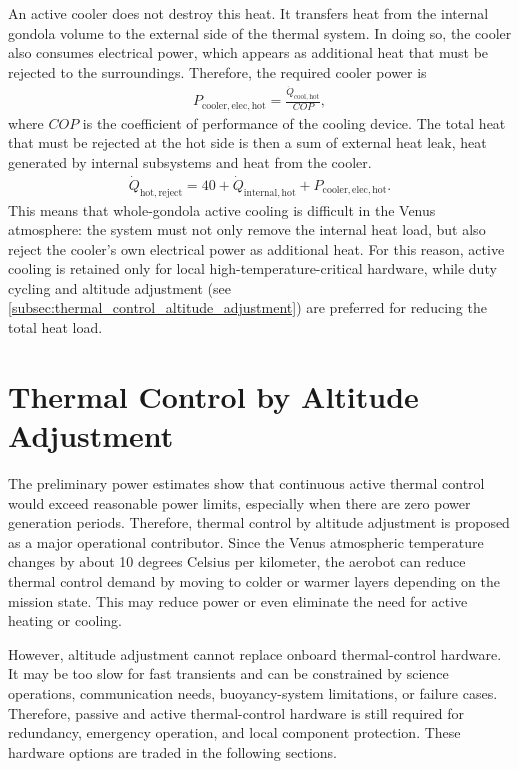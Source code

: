 An active cooler does not destroy this heat. It transfers heat from the internal gondola volume to the external side of the thermal system. In doing so, the cooler also consumes electrical power, which appears as additional heat that must be rejected to the surroundings. Therefore, the required cooler power is
\begin{align}
    P_{\mathrm{cooler,elec,hot}}
    =
    \frac{\dot{Q}_{\mathrm{cool,hot}}}{COP},
    \label{eq:p_cooler_hot}
\end{align}
where \(COP\) is the coefficient of performance of the cooling device. The total heat that must be rejected at the hot side is then a sum of external heat leak, heat generated by internal subsystems and heat from the cooler.
\begin{align}
    \dot{Q}_{\mathrm{hot,reject}}
    =40 + \dot{Q}_{\mathrm{internal,hot}}
    +
    P_{\mathrm{cooler,elec,hot}}.
    \label{eq:q_hot_reject_hot_case}
\end{align}
This means that whole-gondola active cooling is difficult in the Venus atmosphere: the system must not only remove the internal heat load, but also reject the cooler's own electrical power as additional heat. For this reason, active cooling is retained only for local high-temperature-critical hardware, while duty cycling and altitude adjustment (see \autoref{subsec:thermal_control_altitude_adjustment}) are preferred for reducing the total heat load.


\section{Thermal Control by Altitude Adjustment}
\label{subsec:thermal_control_altitude_adjustment}

The preliminary power estimates show that continuous active thermal control would exceed reasonable power limits, especially when there are zero power generation periods. Therefore, thermal control by altitude adjustment is proposed as a major operational contributor. Since the Venus atmospheric temperature changes by about 10 degrees Celsius per kilometer, the aerobot can reduce thermal control demand by moving to colder or warmer layers depending on the mission state. This may reduce power or even eliminate the need for active heating or cooling.

However, altitude adjustment cannot replace onboard thermal-control hardware. It may be too slow for fast transients and can be constrained by science operations, communication needs, buoyancy-system limitations, or failure cases. Therefore, passive and active thermal-control hardware is still required for redundancy, emergency operation, and local component protection. These hardware options are traded in the following sections.

